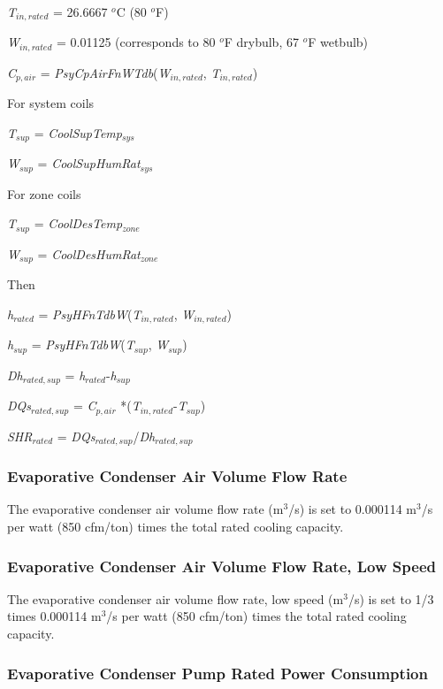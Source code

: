 \emph{T\(_{in,rated}\)} = 26.6667 \(^{o}\)C (80 \(^{o}\)F)

\emph{W\(_{in,rated}\)} = 0.01125 (corresponds to 80 \(^{o}\)F drybulb, 67 \(^{o}\)F wetbulb)

\emph{C\(_{p,air}\)} = \emph{PsyCpAirFnWTdb}(\emph{W\(_{in,rated}\)}, \emph{T\(_{in,rated}\)})

For system coils

\emph{T\(_{sup}\)} = \emph{CoolSupTemp\(_{sys}\)}

\emph{W\(_{sup}\)} = \emph{CoolSupHumRat\(_{sys}\)}

For zone coils

\emph{T\(_{sup}\)} = \emph{CoolDesTemp\(_{zone}\)}

\emph{W\(_{sup}\)} = \emph{CoolDesHumRat\(_{zone}\)}

Then

\emph{h\(_{rated}\)} = \emph{PsyHFnTdbW}(\emph{T\(_{in,rated}\)}, \emph{W\(_{in,rated}\)})

\emph{h\(_{sup}\)} = \emph{PsyHFnTdbW}(\emph{T\(_{sup}\)}, \emph{W\(_{sup}\)})

\emph{Dh}\(_{rated,sup}\) = \emph{h\(_{rated}\)}-\emph{h\(_{sup}\)}

\emph{DQs\(_{rated,sup}\)} = \emph{C\(_{p,air}\)} *(\emph{T\(_{in,rated}\)}-\emph{T\(_{sup}\)})

\emph{SHR\(_{rated}\)} = \emph{DQs\(_{rated,sup}\)}/\emph{Dh}\(_{rated,sup}\)

\subsubsection{Evaporative Condenser Air Volume Flow Rate}\label{evaporative-condenser-air-volume-flow-rate}

The evaporative condenser air volume flow rate (m\(^{3}\)/s) is set to 0.000114 m\(^{3}\)/s per watt (850 cfm/ton) times the total rated cooling capacity.

\subsubsection{Evaporative Condenser Air Volume Flow Rate, Low Speed}\label{evaporative-condenser-air-volume-flow-rate-low-speed}

The evaporative condenser air volume flow rate, low speed (m\(^{3}\)/s) is set to 1/3 times 0.000114 m\(^{3}\)/s per watt (850 cfm/ton) times the total rated cooling capacity.

\subsubsection{Evaporative Condenser Pump Rated Power Consumption}\label{evaporative-condenser-pump-rated-power-consumption}

